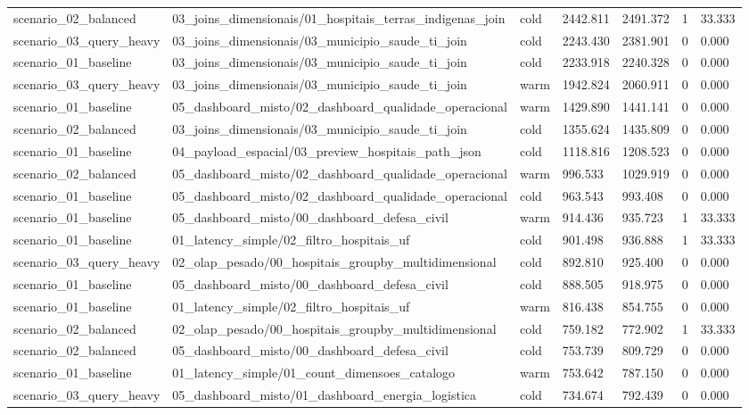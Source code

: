 {\begin{longtable}{p{}p{}p{}p{}p{}p{}p{}}
scenario\_02\_balanced & 03\_joins\_dimensionais/01\_hospitais\_terras\_indigenas\_join & cold & 2442.811 & 2491.372 & 1 & 33.333 \\
scenario\_03\_query\_heavy & 03\_joins\_dimensionais/03\_municipio\_saude\_ti\_join & cold & 2243.430 & 2381.901 & 0 & 0.000 \\
scenario\_01\_baseline & 03\_joins\_dimensionais/03\_municipio\_saude\_ti\_join & cold & 2233.918 & 2240.328 & 0 & 0.000 \\
scenario\_03\_query\_heavy & 03\_joins\_dimensionais/03\_municipio\_saude\_ti\_join & warm & 1942.824 & 2060.911 & 0 & 0.000 \\
scenario\_01\_baseline & 05\_dashboard\_misto/02\_dashboard\_qualidade\_operacional & warm & 1429.890 & 1441.141 & 0 & 0.000 \\
scenario\_02\_balanced & 03\_joins\_dimensionais/03\_municipio\_saude\_ti\_join & cold & 1355.624 & 1435.809 & 0 & 0.000 \\
scenario\_01\_baseline & 04\_payload\_espacial/03\_preview\_hospitais\_path\_json & cold & 1118.816 & 1208.523 & 0 & 0.000 \\
scenario\_02\_balanced & 05\_dashboard\_misto/02\_dashboard\_qualidade\_operacional & warm & 996.533 & 1029.919 & 0 & 0.000 \\
scenario\_01\_baseline & 05\_dashboard\_misto/02\_dashboard\_qualidade\_operacional & cold & 963.543 & 993.408 & 0 & 0.000 \\
scenario\_01\_baseline & 05\_dashboard\_misto/00\_dashboard\_defesa\_civil & warm & 914.436 & 935.723 & 1 & 33.333 \\
scenario\_01\_baseline & 01\_latency\_simple/02\_filtro\_hospitais\_uf & cold & 901.498 & 936.888 & 1 & 33.333 \\
scenario\_03\_query\_heavy & 02\_olap\_pesado/00\_hospitais\_groupby\_multidimensional & cold & 892.810 & 925.400 & 0 & 0.000 \\
scenario\_01\_baseline & 05\_dashboard\_misto/00\_dashboard\_defesa\_civil & cold & 888.505 & 918.975 & 0 & 0.000 \\
scenario\_01\_baseline & 01\_latency\_simple/02\_filtro\_hospitais\_uf & warm & 816.438 & 854.755 & 0 & 0.000 \\
scenario\_02\_balanced & 02\_olap\_pesado/00\_hospitais\_groupby\_multidimensional & cold & 759.182 & 772.902 & 1 & 33.333 \\
scenario\_02\_balanced & 05\_dashboard\_misto/00\_dashboard\_defesa\_civil & cold & 753.739 & 809.729 & 0 & 0.000 \\
scenario\_01\_baseline & 01\_latency\_simple/01\_count\_dimensoes\_catalogo & warm & 753.642 & 787.150 & 0 & 0.000 \\
scenario\_03\_query\_heavy & 05\_dashboard\_misto/01\_dashboard\_energia\_logistica & cold & 734.674 & 792.439 & 0 & 0.000 \\
\bottomrule
\end{longtable}
}
